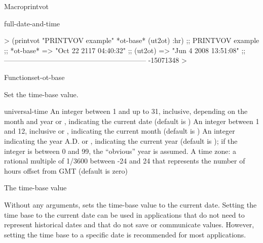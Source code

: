 \documentclass[10pt,twoside,english,pdftex]{article}
\begin{document}
\begin{functiondoc}{Macro}{printvot}{%
    }
\begin{alsos}{full-date-and-time}
\also[printv]
\end{alsos}

%
\fnexamples
%
\W\supp
\begin{example}
  > (printvot "PRINTVOV example" *ot-base* (ut2ot) :hr)
  ;; PRINTVOV example
  ;;   *ot-base* => "Oct 22 2117 04:40:32"
  ;;   (ut2ot) => "Jun  4 2008 13:51:08"
  ;; ------------------------------------------------------------
  -15071348
  >
\end{example}

\end{functiondoc}


\begin{functiondoc}{Function}{set-ot-base}{ 
    }
%

\fnsyntax

\fnpurpose Set the  time-base value.

\fnpackage {}

\fnmodule {}

\fnargs
\begin{args}{universal-time}
  \arg[date] An integer between 1 and up to 31, inclusive, depending
  on the month and year or \nil, indicating the current date (default is \nil)
  \arg[month] An integer between 1 and 12, inclusive or \nil, indicating the
  current month (default is \nil)
  \arg[year] An integer indicating the year A.D. or \nil, indicating the
  current year (default is \nil); if the 
  integer is between 0 and 99, the ``obvious'' year is assumed.
   A time zone: a rational multiple of 1/3600 between
  -24 and 24 that represents the number of hours offset from GMT 
  (default is zero)
\end{args}

\fnreturns The  time-base value

\fndescription Without any arguments,  sets the
time-base value to the current date.  Setting the time base to the current
date can be used in applications that do not need to represent historical
dates and that do not save or communicate  values.
However, setting the time base to a specific date is recommended for most
applications.


\end{functiondoc}
\end{document}
